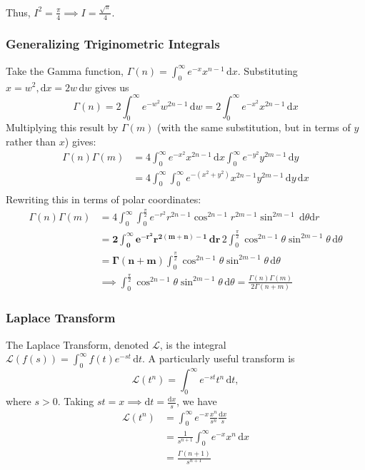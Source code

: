 \documentclass[12pt]{article}
\begin{document}
{Thus, $I^2 = \frac{\pi}{4} \implies I = \frac{\sqrt{\pi}}{4}.$

\subsubsection{Generalizing Triginometric Integrals}\label{sec:generalizing_trig_integrals}

Take the Gamma function, $\Gamma(n) = \int_{0}^{\infty} e^{-x} x^{n-1}\,\text{d}x$. Substituting $x = w^2, \text{d}x = 2w\, \text{d}w$ gives us \[\Gamma(n) = 2\int_0^\infty e^{-w^2} w^{2n-1} \, \text{d}w =2\int_0^\infty e^{-x^2} x^{2n-1} \, \text{d}x \] Multiplying this result by $\Gamma(m)$ (with the same substitution, but in terms of $y$ rather than $x$) gives: \begin{align*}
    \Gamma(n)\Gamma(m) &= 4 \int_{0}^{\infty} e^{-x^2} x^{2n-1} \, \text{d}x\int_0^\infty e^{-y^2} y^{2m-1} \, \text{d}y\\
    &= 4 \int_{0}^{\infty}\int_{0}^{\infty} e^{-(x^2+y^2)} x^{2n-1} y^{2m-1} \, \text{d}y\,\text{d}x\\
\end{align*}
Rewriting this in terms of polar coordinates:
\begin{align*}
    \Gamma(n)\Gamma(m) &= 4 \int_0^\infty \int_0^{\frac{\pi}{2}} e^{-r^2} r^{2n-1} \cos^{2n-1} r^{2m-1} \sin^{2m-1} \, \text{d}\theta\text{d}r\\
    &= \mathbf{2 \int_{0}^{\infty} e^{-r^2} r^{2(m+n)-1} \, \text{d}r }\, 2 \int_0^{\frac{\pi}{2}} \cos^{2n-1}\theta \sin^{2m-1} \theta \,\text{d}\theta\\
    &= \mathbf{\Gamma(n + m)} \int_0^{\frac{\pi}{2}} \cos^{2n-1}\theta \sin^{2m-1} \theta \,\text{d}\theta\\
    &\implies \int_0^{\frac{\pi}{2}} \cos^{2n-1}\theta \sin^{2m-1} \theta \,\text{d}\theta = \frac{\Gamma(n)\Gamma(m)}{2 \Gamma(n+m)}
\end{align*}
\subsubsection{Laplace Transform}

The Laplace Transform, denoted $\mathcal{L}$, is the integral $\mathcal{L}(f(s)) = \int_0^\infty f(t) e^{-st} \,\text{d}t$. A particularly useful transform is \[\mathcal{L}(t^n) = \int_0^\infty e^{-st}t^n\,\text{d}t,\] where $s>0$. Taking $st = x \implies \text{d}t = \frac{\text{d}x}{s}$, we have \begin{align*}
    \mathcal{L}(t^n) &= \int_0^\infty e^{-x} \frac{x^n}{s^n} \frac{\text{d}x}{s}\\
    &= \frac{1}{s^{n+1}} \int_0^\infty e^{-x} x^n \,\text{d}x\\
    &= \frac{\Gamma(n+1)}{s^{n+1}}
\end{align*}

}
\end{document}
